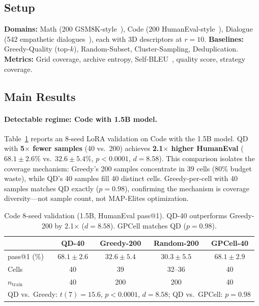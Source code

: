 \documentclass{article}
\theoremstyle{plain}
\theoremstyle{remark}
\begin{document}
\subsection{Setup}

\textbf{Domains:} Math (200 GSM8K-style~\citep{gsm8k_2021}), Code (200 HumanEval-style~\citep{humaneval_2021}), Dialogue (542 empathetic dialogues~\citep{ccse_cs_2026}), each with 3D descriptors at $r{=}10$.
\textbf{Baselines:} Greedy-Quality (top-$k$), Random-Subset, Cluster-Sampling, Deduplication.
\textbf{Metrics:} Grid coverage, archive entropy, Self-BLEU~\citep{self_bleu_2017}, quality score, strategy coverage.

\subsection{Main Results}

\paragraph{Detectable regime: Code with 1.5B model.}
Table~\ref{tab:code_8seed} reports an 8-seed LoRA validation on Code with the 1.5B model.
QD with \textbf{5$\times$ fewer samples} (40 vs.\ 200) achieves \textbf{2.1$\times$ higher HumanEval} ($68.1{\pm}2.6\%$ vs.\ $32.6{\pm}5.4\%$, $p{<}0.0001$, $d{=}8.58$).
This comparison isolates the coverage mechanism: Greedy's 200 samples concentrate in 39 cells (80\% budget waste), while QD's 40 samples fill 40 distinct cells.
Greedy-per-cell with 40 samples matches QD exactly ($p{=}0.98$), confirming the mechanism is coverage diversity---not sample count, not MAP-Elites optimization.


\begin{table}[t]
\centering
\caption{Code 8-seed validation (1.5B, HumanEval pass@1). QD-40 outperforms Greedy-200 by 2.1$\times$ ($d{=}8.58$). GPCell matches QD ($p{=}0.98$).}
\label{tab:code_8seed}
\begin{tabular}{lcccc}
\toprule
 & \textbf{QD-40} & \textbf{Greedy-200} & \textbf{Random-200} & \textbf{GPCell-40} \\
\midrule
pass@1 (\%) & $\mathbf{68.1 \pm 2.6}$ & $32.6 \pm 5.4$ & $30.3 \pm 5.5$ & $68.1 \pm 2.9$ \\
Cells & 40 & 39 & 32--36 & 40 \\
$n_{\text{train}}$ & 40 & 200 & 200 & 40 \\
\midrule
\multicolumn{5}{l}{\footnotesize QD vs.\ Greedy: $t(7){=}15.6$, $p{<}0.0001$, $d{=}8.58$; QD vs.\ GPCell: $p{=}0.98$} \\
\bottomrule
\end{tabular}
\end{table}
\end{document}
